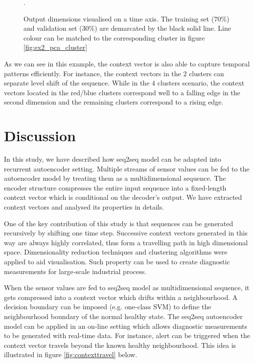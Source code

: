 \documentclass[11pt]{article} %
\theoremstyle{plain}
\theoremstyle{definition}
\begin{document}
\begin{figure}[H]
	\caption{Output dimensions visualised on a time axis. The training set (\(70\%\)) and validation set (\(30\%\)) are demarcated by the black solid line. Line colour can be matched to the corresponding cluster in figure \ref{fig:ex2_pca_cluster}}.
	\label{fig:ex2_context_timeline}
\end{figure}

As we can see in this example, the context vector is also able to capture temporal patterns efficiently. For instance, the context vectors in the \(2\) clusters can separate level shift of the sequence. While in the \(4\) clusters scenario, the context vectors located in the red/blue clusters correspond well to a falling edge  in the second dimension and the remaining clusters correspond to a rising edge.

\newpage
\section{Discussion}

In this study, we have described how seq2seq model can be adapted into recurrent autoencoder setting. Multiple streams of sensor values can be fed to the autoencoder model by treating them as a multidimensional sequence. The encoder structure compresses the entire input sequence into a fixed-length context vector which is conditional on the decoder's output. We have extracted context vectors and analysed its properties in details. 

One of the key contribution of this study is that sequences can be generated recursively by shifting one time step. Successive context vectors generated in this way are always highly correlated, thus form a travelling path in high dimensional space. Dimensionality reduction techniques and clustering algorithms were applied to aid visualisation. Such property can be used to create diagnostic measurements for large-scale industrial process. 
 
When the sensor values are fed to seq2seq model as multidimensional sequence, it gets compressed into a context vector which drifts within a neighbourhood. A decision boundary can be imposed (e.g. one-class SVM) to define the neighbourhood boundary of the normal healthy state. The seq2seq autoencoder model can be applied in an on-line setting which allows diagnostic measurements to be generated with real-time data. For instance, alert can be triggered when the context vector travels beyond the known healthy neighbourhood. This idea is illustrated in figure \ref{fig:contexttravel} below. 
\end{document}
